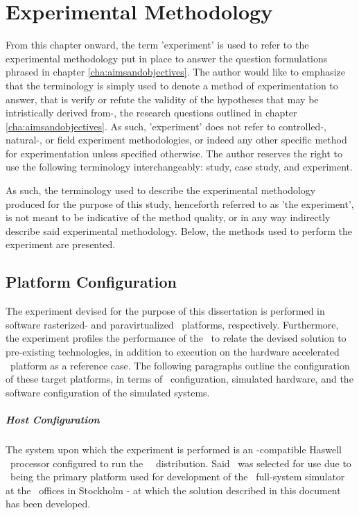 
\chapter{Experimental Methodology}
\label{cha:experimentalmethodology}
From this chapter onward, the term 'experiment' is used to refer to the experimental methodology put in place to answer the question formulations phrased in chapter \ref{cha:aimsandobjectives}.
The author would like to emphasize that the terminology is simply used to denote a method of experimentation to answer, that is verify or refute the validity of the hypotheses that may be intristically derived from-, the research questions outlined in chapter \ref{cha:aimsandobjectives}.
As such, 'experiment' does not refer to controlled-, natural-, or field experiment methodologies, or indeed any other specific method for experimentation unless specified otherwise.
The author reserves the right to use the following terminology interchangeably: study, case study, and experiment.

As such, the terminology used to describe the experimental methodology produced for the purpose of this study, henceforth referred to as 'the experiment', is not meant to be indicative of the method quality, or in any way indirectly describe said experimental methodology.
Below, the methods used to perform the experiment are presented.

\section{Platform Configuration}
\label{sec:experimentalmethodology_platformconfiguration}
The experiment devised for the purpose of this dissertation is performed in software rasterized- and paravirtualized \dvttermsimics\ platforms, respectively.
Furthermore, the experiment profiles the performance of the \dvttermandroidemulator\ to relate the devised solution to pre-existing technologies, in addition to execution on the hardware accelerated \dvttermhost\ platform as a reference case.
The following paragraphs outline the configuration of these target platforms, in terms of \dvttermhost\ configuration, simulated hardware, and the software configuration of the simulated systems.

\paragraph{Host Configuration}
\label{par:experimentalmethodology_platformconfiguration_hostconfiguration}
The system upon which the experiment is performed is an \dvttermxeightysix -compatible Haswell \dvttermintel\ processor configured to run the \dvttermfedora\ \dvttermlinux\ distribution.
Said \dvttermos\ was selected for use due to \dvttermfedora\ being the primary platform used for development of the \dvttermsimics\ full-system simulator at the \dvttermintel\ offices in Stockholm - at which the solution described in this document has been developed.

